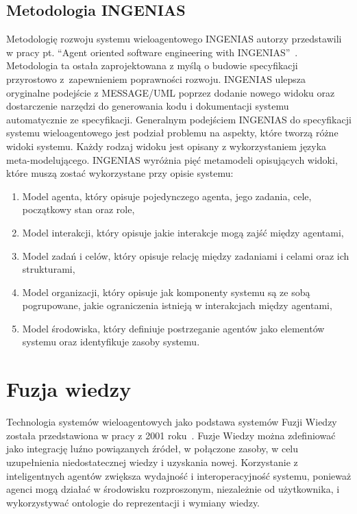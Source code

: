 \documentclass[11pt]{report}
\begin{document}
    \subsection{Metodologia INGENIAS}
    Metodologię rozwoju systemu wieloagentowego INGENIAS autorzy przedstawili w pracy pt. ``Agent oriented software engineering with INGENIAS''~\cite{Pavon2003}.
    Metodologia ta ostała zaprojektowana z myślą o budowie specyfikacji przyrostowo z~zapewnieniem poprawności rozwoju.
    INGENIAS ulepsza oryginalne podejście z MESSAGE/UML poprzez dodanie nowego widoku oraz dostarczenie narzędzi do generowania kodu i dokumentacji systemu automatycznie ze specyfikacji.
    Generalnym podejściem INGENIAS do specyfikacji systemu wieloagentowego jest podział problemu na aspekty, które tworzą różne widoki systemu.
    Każdy rodzaj widoku jest opisany z wykorzystaniem języka meta-modelującego.
    INGENIAS wyróżnia pięć metamodeli opisujących widoki, które muszą zostać wykorzystane przy opisie systemu:
    \begin{enumerate}
        \item Model agenta, który opisuje pojedynczego agenta, jego zadania, cele, początkowy stan oraz role,
        \item Model interakcji, który opisuje jakie interakcje mogą zajść między agentami,
        \item Model zadań i celów, który opisuje relację między zadaniami i celami oraz ich strukturami,
        \item Model organizacji, który opisuje jak komponenty systemu są ze sobą pogrupowane, jakie ograniczenia istnieją w interakcjach między agentami,
        \item Model środowiska, który definiuje postrzeganie agentów jako elementów systemu oraz identyfikuje zasoby systemu.
    \end{enumerate}


    \section{Fuzja wiedzy}

    Technologia systemów wieloagentowych jako podstawa systemów Fuzji Wiedzy została przedstawiona w pracy z 2001 roku~\cite{Smirnov2002}.
    Fuzje Wiedzy można zdefiniować jako integrację luźno powiązanych źródeł, w połączone zasoby, w celu uzupełnienia niedostatecznej wiedzy i uzyskania nowej.
    Korzystanie z inteligentnych agentów zwiększa wydajność i interoperacyjność systemu, ponieważ agenci mogą działać w środowisku rozproszonym,
    niezależnie od użytkownika, i wykorzystywać ontologie do reprezentacji i wymiany wiedzy.
\end{document}
